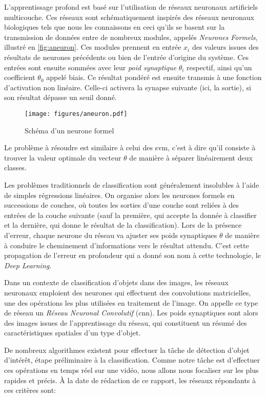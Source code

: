 			L'apprentissage profond est basé sur l'utilisation de réseaux neuronaux artificiels multicouche. Ces réseaux sont schématiquement inspirés des réseaux neuronaux biologiques tels que nous les connaissons en ceci qu'ils se basent sur la transmission de données entre de nombreux modules, appelés \emph{Neurones Formels}, illustré en \autoref{fig:aneuron}. Ces modules prennent en entrée $x_{i}$ des valeurs issues des résultats de neurones précédents ou bien de l'entrée d'origine du système. Ces entrées sont ensuite sommées avec leur \emph{poid synaptique} $\theta_{i}$ respectif, ainsi qu’un coefficient $\theta_{0}$ appelé biais. Ce résultat pondéré est ensuite transmis à une fonction d’activation non linéaire. Celle-ci activera la synapse suivante (ici, la sortie), si son résultat dépasse un seuil donné.
			\begin{figure}[h]
			{
				\centering
				\texttt{[image: figures/aneuron.pdf]}
				\caption{Schéma d'un neurone formel}
				\label{fig:aneuron}
			}
			\end{figure}
			Le problème à résoudre est similaire à celui des \gls{svm}, c'est à dire qu'il consiste à trouver la valeur optimale du vecteur $\theta$ de manière à séparer linéairement deux classes.
			\par
			Les problèmes traditionnels de classification sont généralement insolubles à l'aide de simples régressions linéaires. On organise alors les neurones formels en successions de couches, où toutes les sorties d'une couche sont reliées à des entrées de la couche suivante (sauf la première, qui accepte la donnée à classifier et la dernière, qui donne le résultat de la classification). Lors de la présence d'erreur, chaque neurone du réseau va ajuster ses poids synaptiques $\theta$ de manière à conduire le cheminement d'informations vers le résultat attendu. C'est cette propagation de l'erreur en profondeur qui a donné son nom à cette technologie, le \emph{Deep Learning}.
			\par
			Dans un contexte de classification d'objets dans des images, les réseaux neuronaux emploient des neurones qui effectuent des convolutions matricielles, une des opérations les plus utilisées en traitement de l'image. On appelle ce type de réseau un \emph{Réseau Neuronal Convolutif} (\gls{cnn}). Les poids synaptiques sont alors des images issues de l'apprentissage du réseau, qui constituent un résumé des caractéristiques spatiales d'un type d'objet.
			\par
			De nombreux algorithmes existent pour effectuer la tâche de détection d'objet d'intérêt, étape préliminaire à la classification. Comme notre tâche est d'effectuer ces opérations en temps réel sur une vidéo, nous allons nous focaliser sur les plus rapides et précis. À la date de rédaction de ce rapport, les réseaux répondants à ces critères sont:
			
